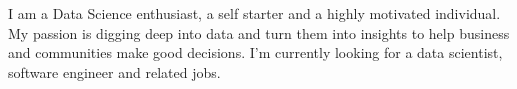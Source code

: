 \documentclass[letter,10pt]{article}
\begin{document}
I am a Data Science enthusiast, a self starter and a highly motivated individual. My passion is digging deep into data and turn them into insights to help business and communities make good decisions. I'm currently looking for a data scientist, software engineer and related jobs. 

\end{document}
